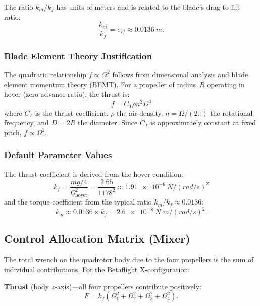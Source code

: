 \documentclass[journal]{IEEEtran}
\begin{document}
The ratio $k_m / k_f$ has units of meters and is related to the blade's drag-to-lift ratio:
\begin{equation}
  \frac{k_m}{k_f} = c_{\tau f} \approx \SI{0.0136}{m}.
  \label{eq:km_kf_ratio}
\end{equation}

\subsubsection{Blade Element Theory Justification}

The quadratic relationship $f \propto \Omega^2$ follows from dimensional analysis and blade element momentum theory (BEMT). For a propeller of radius~$R$ operating in hover (zero advance ratio), the thrust is:
\begin{equation}
  f = C_T \rho n^2 D^4
  \label{eq:bemt}
\end{equation}
where $C_T$ is the thrust coefficient, $\rho$ the air density, $n = \Omega/(2\pi)$ the rotational frequency, and $D = 2R$ the diameter. Since $C_T$ is approximately constant at fixed pitch, $f \propto \Omega^2$.

\subsubsection{Default Parameter Values}

The thrust coefficient is derived from the hover condition:
\begin{equation}
  k_f = \frac{mg/4}{\Omega_{\text{hover}}^2} = \frac{2.65}{1178^2} \approx \SI{1.91e-6}{N/(rad/s)^2}
  \label{eq:kf_derivation}
\end{equation}
and the torque coefficient from the typical ratio $k_m / k_f \approx 0.0136$:
\begin{equation}
  k_m \approx 0.0136 \times k_f = \SI{2.6e-8}{N.m/(rad/s)^2}.
  \label{eq:km_derivation}
\end{equation}

\subsection{Control Allocation Matrix (Mixer)}
\label{sec:mixer}

The total wrench on the quadrotor body due to the four propellers is the sum of individual contributions. For the Betaflight X-configuration:

\textbf{Thrust} (body $z$-axis)---all four propellers contribute positively:
\begin{equation}
  F = k_f (\Omega_1^2 + \Omega_2^2 + \Omega_3^2 + \Omega_4^2).
  \label{eq:total_thrust}
\end{equation}
\end{document}
